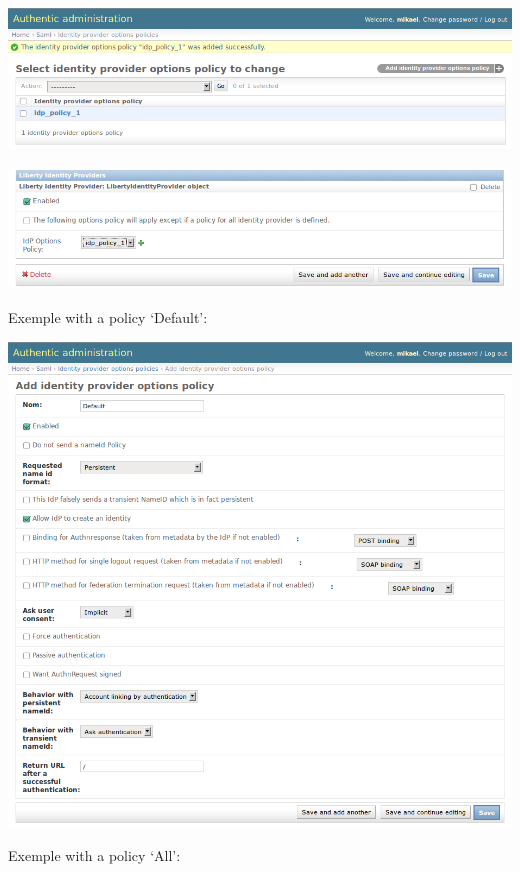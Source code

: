 \documentclass[letterpaper,10pt,english]{sphinxmanual}
\begin{document}
\includegraphics{sp_options_regular_saved.png}

\includegraphics{sp_options_regular_modify_sp.png}

Exemple with a policy `Default':

\includegraphics{sp_options_default.png}

Exemple with a policy `All':
\end{document}
